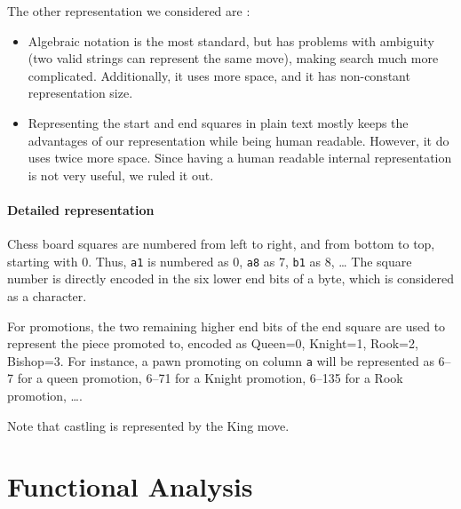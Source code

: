 \documentclass{article}
\begin{document}
The other representation we considered are :
\begin{itemize}
\item Algebraic notation is the most standard, but has problems with ambiguity
(two valid strings can represent the same move), making search much more complicated.
Additionally, it uses more space, and it has non-constant representation size.

\item Representing the start and end squares in plain text mostly keeps the advantages
of our representation while being human readable. However, it do uses twice more space.
Since having a human readable internal representation is not very useful,
we ruled it out.
\end{itemize}


\paragraph{Detailed representation}
Chess board squares are numbered from left to right, and from bottom to top,
starting with 0. Thus, \verb|a1| is numbered as 0, \verb|a8| as 7, \verb|b1| as 8, \dots
The square number is directly encoded in the six lower end bits of a byte, which is considered as a character.

For promotions, the two remaining higher end bits of the end square are used to represent the piece promoted to,
encoded as Queen=0, Knight=1, Rook=2, Bishop=3.
For instance, a pawn promoting on column \verb|a| will be represented as 6--7 for a queen promotion,
6--71 for a Knight promotion, 6--135 for a Rook promotion, \dots.

Note that castling is represented by the King move.


\section{Functional Analysis}
\end{document}
